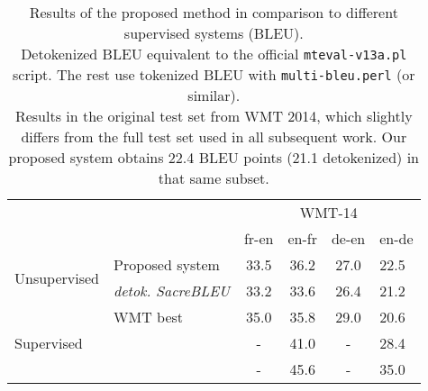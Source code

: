 \documentclass[11pt,a4paper]{article}
\begin{document}
\begin{table*}[t]
\begin{center}
\begin{small}
  \begin{tabular}{llcccl}
    \toprule
    & & \multicolumn{4}{c}{WMT-14} \\
    \cmidrule{3-6}
    & & fr-en & en-fr & de-en & en-de \\
    \midrule
    \multirow{2}{*}{Unsupervised}
    & Proposed system & 33.5 & 36.2 & 27.0 & 22.5 \\
    & \quad \textit{detok. SacreBLEU} & 33.2 & 33.6 & 26.4 & 21.2 \\
    \midrule
    \multirow{3}{*}{Supervised}
    & WMT best & 35.0 & 35.8 & 29.0 & 20.6 \\
    & \citet{vaswani2017attention} & - & 41.0 & - & 28.4 \\
    & \citet{edunov2018understanding} & - & 45.6 & - & 35.0 \\
    \bottomrule
  \end{tabular}
\end{small}
\end{center}
\caption{Results of the proposed method in comparison to different supervised systems (BLEU). \\
Detokenized BLEU equivalent to the official \texttt{mteval-v13a.pl} script. The rest use tokenized BLEU with \texttt{multi-bleu.perl} (or similar). \\
Results in the original test set from WMT 2014, which slightly differs from the full test set used in all subsequent work. Our proposed system obtains 22.4 BLEU points (21.1 detokenized) in that same subset.}
\label{tab:results_supervised}
\end{table*}
\end{document}
